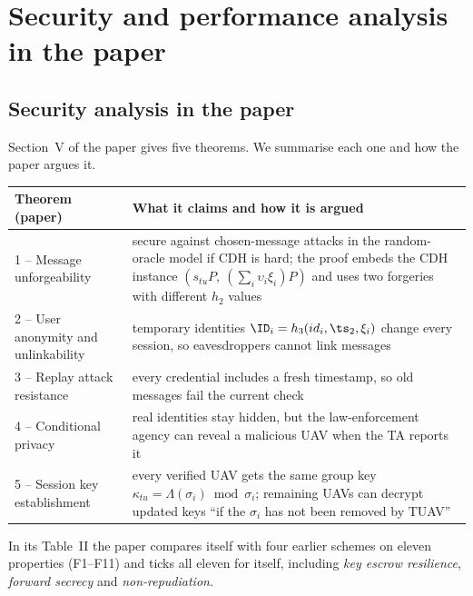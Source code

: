 \chapter{Security and performance analysis in the paper}\label{ch:p1analysis}
\section{Security analysis in the paper}
Section~V of the paper gives five theorems. We summarise each one and how the paper argues it.
\begin{center}
\small
\begin{tabularx}{\linewidth}{@{}p{3.8cm} X@{}}
\toprule
\textbf{Theorem (paper)} & \textbf{What it claims and how it is argued}\\
\midrule
1 -- Message unforgeability & secure against chosen-message attacks in the random-oracle model if CDH is hard; the proof embeds the CDH instance
$(s_{tu}P,\ (\sum_i\upsilon_i\xi_i)P)$ and uses two forgeries with different $h_2$ values\\
2 -- User anonymity and unlinkability & temporary identities $\ID_i=h_3(id_i,\ts_2,\xi_i)$ change every session, so eavesdroppers cannot link messages\\
3 -- Replay attack resistance & every credential includes a fresh timestamp, so old messages fail the current check\\
4 -- Conditional privacy & real identities stay hidden, but the law-enforcement agency can reveal a malicious UAV when the TA reports it\\
5 -- Session key establishment & every verified UAV gets the same group key $\kappa_{tu}=\Lambda(\sigma_i)\bmod\sigma_i$; remaining UAVs can decrypt
updated keys ``if the $\sigma_i$ has not been removed by TUAV''\\
\bottomrule
\end{tabularx}
\end{center}
In its Table~II the paper compares itself with four earlier schemes on eleven properties (F1--F11) and ticks all eleven for itself, including
\emph{key escrow resilience}, \emph{forward secrecy} and \emph{non-repudiation}.

